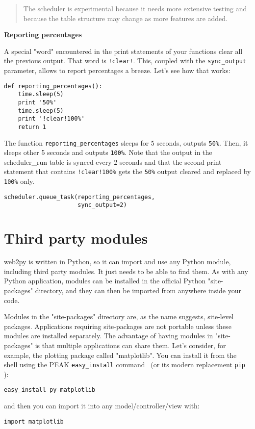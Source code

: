 \documentclass[justified,sixbynine,notoc]{tufte-book}
\def\ft{\small\tt}
\def\inxx#1{\index{#1}}
\begin{document}
\begin{fullwidth}
\begin{quote}The scheduler is experimental because it needs more extensive testing and because the table structure may change as more features are added.\end{quote}
{\bf Reporting percentages}

A special "word" encountered in the print statements of your functions clear all
the previous output. That word is {\ft !clear!}.
This, coupled with the {\ft sync\_output} parameter, allows to report percentages
a breeze. Let's see how that works:

\begin{lstlisting}
def reporting_percentages():
    time.sleep(5)
    print '50%'
    time.sleep(5)
    print '!clear!100%'
    return 1
\end{lstlisting}

The function {\ft reporting\_percentages} sleeps for 5 seconds, outputs {\ft 50\%}.
Then, it sleeps other 5 seconds and outputs {\ft 100\%}. Note that the output in the scheduler\_run table is synced every 2 seconds and that the second print statement that contains {\ft !clear!100\%} gets the {\ft 50\%} output cleared and replaced by {\ft 100\%} only.

\begin{lstlisting}
scheduler.queue_task(reporting_percentages,
                     sync_output=2)
\end{lstlisting}

\goodbreak\section{Third party modules}

\inxx{import}
\noindent web2py is written in Python, so it can import and use any Python module, including third party modules. It just needs to be able to find them. As with any Python application, modules can be installed in the official Python "site-packages" directory, and they can then be imported from anywhere inside your code.

Modules in the "site-packages" directory are, as the name suggests, site-level packages. Applications requiring site-packages are not portable unless these modules are installed separately. The advantage of having modules in "site-packages" is that multiple applications can share them. Let's consider, for example, the plotting package called "matplotlib". You can install it from the shell using the PEAK {\ft easy\_install} command~\cite{easy-install} (or its modern replacement {\ft pip}~\cite{PIP} ):
\begin{lstlisting}
easy_install py-matplotlib
\end{lstlisting}
\noindent and then you can import it into any model/controller/view with:
\begin{lstlisting}
import matplotlib
\end{lstlisting}


\end{fullwidth}
\end{document}
